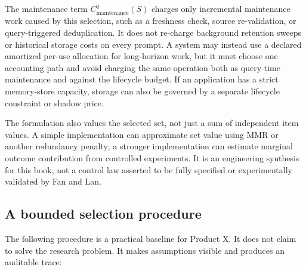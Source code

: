 The maintenance term \(C_{\mathrm{maintenance}}^{q}(S)\) charges only incremental maintenance work caused by this selection, such as a freshness check, source re-validation, or query-triggered deduplication. It does not re-charge background retention sweeps or historical storage costs on every prompt. A system may instead use a declared amortized per-use allocation for long-horizon work, but it must choose one accounting path and avoid charging the same operation both as query-time maintenance and against the lifecycle budget. If an application has a strict memory-store capacity, storage can also be governed by a separate lifecycle constraint or shadow price.

The formulation also values the selected set, not just a sum of independent item values. A simple implementation can approximate set value using MMR or another redundancy penalty; a stronger implementation can estimate marginal outcome contribution from controlled experiments. It is an engineering synthesis for this book, not a control law asserted to be fully specified or experimentally validated by Fan and Lan.

\subsection{A bounded selection procedure}
\label{subsec:ch12-selection-procedure}

\EngineeringLabel{} The following procedure is a practical baseline for Product X. It does not claim to solve the research problem. It makes assumptions visible and produces an auditable trace:

